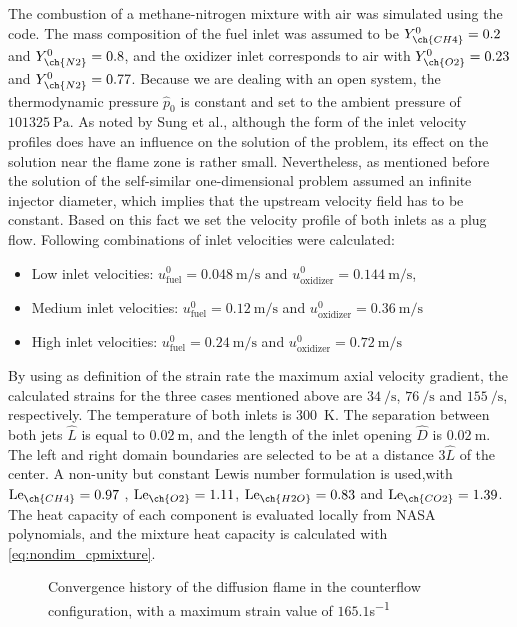 The combustion of a methane-nitrogen mixture with air was simulated using the \BoSSS code. The mass composition of the fuel inlet was assumed to be  $Y^0_{\ch{CH4}} = 0.2$ and $Y^0_{\ch{N2}} = 0.8$, and the oxidizer inlet corresponds to air with   $Y^0_{\ch{O2}} = 0.23$ and $Y^0_{\ch{N2}} = 0.77$. Because we are dealing with an open system, the thermodynamic pressure $\hat p_0$ is constant and set to the ambient pressure of $\SI{101325}{\pascal}$. As noted by Sung et al., \cite{sungStructuralResponseCounterflow1995} although the form of the inlet velocity profiles does have an influence on the solution of the problem, its effect on the solution near the flame zone is rather small. Nevertheless, as mentioned before the solution of the self-similar one-dimensional problem assumed an infinite injector diameter, which implies that the upstream velocity field has to be constant. Based on this fact we set the velocity profile of both inlets as a plug flow. Following combinations of inlet velocities were calculated:
\begin{itemize}
	\item  Low inlet velocities:  $u^0_{\text{fuel}} = \SI{0.048}{\meter \per \second}$ and  $u^0_{\text{oxidizer}} = \SI{0.144}{\meter \per \second}$,
	\item Medium inlet velocities:  $u^0_{\text{fuel}} = \SI{0.12}{\meter \per \second}$ and  $u^0_{\text{oxidizer}} = \SI{0.36}{\meter \per \second}$
	\item High inlet velocities: $u^0_{\text{fuel}}  = \SI{0.24}{\meter \per \second}$ and   $u^0_{\text{oxidizer}} = \SI{0.72}{\meter \per \second}$
\end{itemize}
By using as definition of the strain rate the maximum axial velocity gradient, the calculated strains for the three cases mentioned above are $\SI{34}{\per\second}$, $\SI{76}{\per\second}$ and $\SI{155}{\per\second}$, respectively. The temperature of both inlets is \SI{300}{\kelvin}. The separation between both jets $\hat L$ is equal to $\SI{0.02}{\meter}$, and the length of the inlet opening $\hat D$ is $\SI{0.02}{\meter}$. The left and right domain boundaries are selected to be at a distance $3\hat L$ of the center. A non-unity but constant Lewis number formulation is used,with
$\Lewis_{\ch{CH4}} =  0.97 $ , $\Lewis_{\ch{O2}} = 1.11 $, $\Lewis_{\ch{H2O}} = 0.83 $ and $\Lewis_{\ch{CO2}} = 1.39 $.\cite{smookePremixedNonpremixedTest1991} The heat capacity of each component is evaluated locally from NASA polynomials, and the mixture heat capacity is calculated with \cref{eq:nondim_cpmixture}.
\begin{figure}[t!]
	\centering
	\caption{Convergence history of the diffusion flame in the counterflow configuration, with a maximum strain value of $165.1 $\si{s^{-1}}}
	\label{fig:CDF_ConvergenceStory}
\end{figure}

